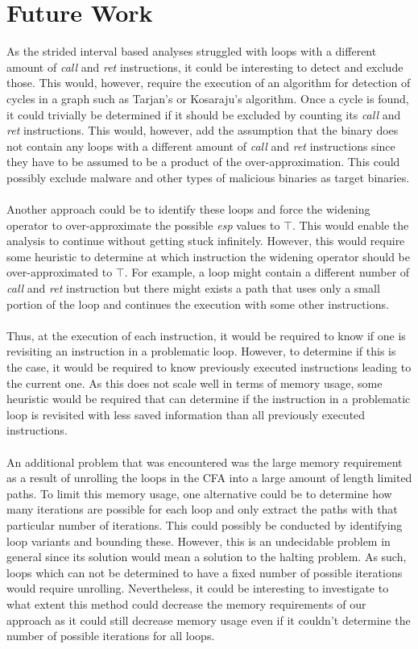 \documentclass{kththesis}
\newcommand{\fbcomment}[1]{{#1}}
\renewcommand{\fbcomment}[1]{}
\renewcommand{\it}[1]{\textit{#1}}
\begin{document}
\section{Future Work}
\fbcomment{\color{red}Goal: Describe how the work in this thesis can be extended.}
As the strided interval based analyses struggled with loops with a different amount of \it{call} and \it{ret} instructions, it could be interesting to detect and exclude those. This would, however, require the execution of an algorithm for detection of cycles in a graph such as Tarjan's or Kosaraju's algorithm. Once a cycle is found, it could trivially be determined if it should be excluded by counting its \it{call} and \it{ret} instructions. This would, however, add the assumption that the binary does not contain any loops with a different amount of \it{call} and \it{ret} instructions since they have to be assumed to be a product of the over-approximation. This could possibly exclude malware and other types of malicious binaries as target binaries.
\\ \\
Another approach could be to identify these loops and force the widening operator to over-approximate the possible \it{esp} values to $\top$. This would enable the analysis to continue without getting stuck infinitely. However, this would require some heuristic to determine at which instruction the widening operator should be over-approximated to $\top$. For example, a loop might contain a different number of \it{call} and \it{ret} instruction but there might exists a path that uses only a small portion of the loop and continues the execution with some other instructions. 
\\ \\
Thus, at the execution of each instruction, it would be required to know if one is revisiting an instruction in a problematic loop. However, to determine if this is the case, it would be required to know previously executed instructions leading to the current one. As this does not scale well in terms of memory usage, some heuristic would be required that can determine if the instruction in a problematic loop is revisited with less saved information than all previously executed instructions.
\\ \\
An additional problem that was encountered was the large memory requirement as a result of unrolling the loops in the CFA into a large amount of length limited paths. To limit this memory usage, one alternative could be to determine how many iterations are possible for each loop and only extract the paths with that particular number of iterations. This could possibly be conducted by identifying loop variants and bounding these. However, this is an undecidable problem in general since its solution would mean a solution to the halting problem. As such, loops which can not be determined to have a fixed number of possible iterations would require unrolling. Nevertheless, it could be interesting to investigate to what extent this method could decrease the memory requirements of our approach as it could still decrease memory usage even if it couldn't determine the number of possible iterations for all loops.
\end{document}
